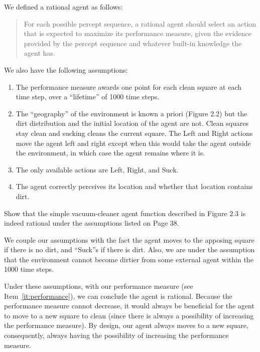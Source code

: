 \documentclass[12pt]{scrartcl}
\begin{document}
\maketitle

We defined a rational agent as follows:

\begin{quote}
    For each possible percept sequence, a rational agent should select an action that is expected to maximize its performance measure, given the evidence provided by the percept sequence and whatever built-in knowledge the agent has.
\end{quote}

We also have the following assumptions:

\begin{enumerate}
    \item\label{it:performance} The performance measure awards one point for each clean square at each time step, over a ``lifetime'' of \num{1000} time steps.
    \item\label{it:never_worse} The ``geography'' of the environment is known a priori (Figure 2.2) but the dirt distribution and the initial location of the agent are not. Clean squares stay clean and sucking cleans the current square. The Left and Right actions move the agent left and right except when this would take the agent outside the environment, in which case the agent remains where it is.
    \item The only available actions are Left, Right, and Suck.
    \item The agent correctly perceives its location and whether that location contains dirt.
\end{enumerate}

\begin{statement}
    Show that the simple vacuum-cleaner agent function described in Figure 2.3 is indeed rational under the assumptions listed on Page 38.
\end{statement}


We couple our assumptions with the fact the agent moves to the apposing square if there is no dirt, and ``Suck''s if there is dirt. Also, we are under the assumption that the environment cannot become dirtier from some external agent within the \num{1000} time steps.

Under these assumptions, with our performance measure (see Item~\ref{it:performance}), we can conclude the agent is rational. Because the performance measure cannot decrease, it would always be beneficial for the agent to move to a new square to clean (since there is always a possibility of increasing the performance measure). By design, our agent always moves to a new square, consequently, always having the possibility of increasing the performance measure.
\end{document}

